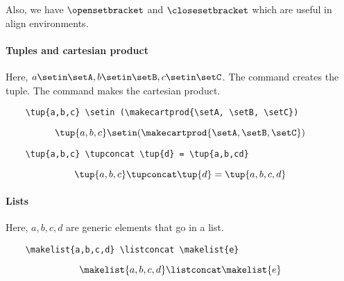 Also, we have \str{\opensetbracket} $\opensetbracket$ and \str{\closesetbracket} $\closesetbracket$ which are useful in align environments.

\paragraph{Tuples and cartesian product}
Here, $a\setin \setA, b \setin \setB, c \setin \setC$.
The command \str{\tup} creates the tuple. The command \str{\makecartprod} makes the cartesian product.
\begin{verbatim}
    \tup{a,b,c} \setin (\makecartprod{\setA, \setB, \setC})
\end{verbatim}
\begin{equation}
    \tup{a,b,c} \setin (\makecartprod{\setA, \setB, \setC})
\end{equation}
\begin{verbatim}
    \tup{a,b,c} \tupconcat \tup{d} = \tup{a,b,cd}
\end{verbatim}
\begin{equation}
    \tup{a,b,c} \tupconcat \tup{d} = \tup{a,b,c,d}
\end{equation}


\paragraph{Lists}
Here, $a, b, c, d$ are generic elements that go in a list.
\begin{verbatim}
    \makelist{a,b,c,d} \listconcat \makelist{e}
\end{verbatim}
\begin{equation}
    \makelist{a,b,c,d} \listconcat \makelist{e}
\end{equation}

